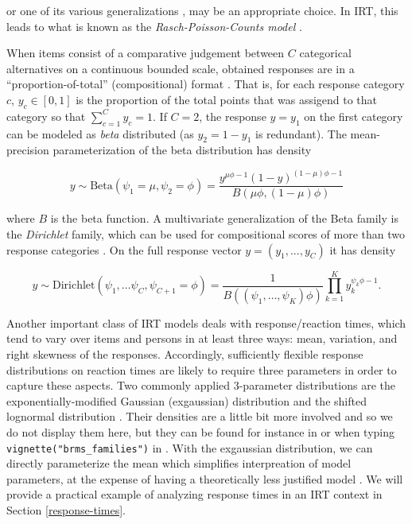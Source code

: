\documentclass[jss]{jss}
\begin{document}
or one of its various generalizations \citep[e.g., see][]{shmueli2005},
may be an appropriate choice. In IRT, this leads to what is known as the
\emph{Rasch-Poisson-Counts model} \citep[RPCM;][]{rasch1960}.

When items consist of a comparative judgement between \(C\) categorical
alternatives on a continuous bounded scale, obtained responses are in a
``proportion-of-total'' (compositional) format \citep{hijazi2009}. That
is, for each response category \(c\), \(y_c \in [0, 1]\) is the
proportion of the total points that was assigend to that category so
that \(\sum_{c=1}^C y_c = 1\). If \(C = 2\), the response \(y = y_1\) on
the first category can be modeled as \emph{beta} distributed (as
\(y_2 = 1 - y_1\) is redundant). The mean-precision parameterization of
the beta distribution has density

\[
y \sim \text{Beta}(\psi_1 = \mu, \psi_2 = \phi) = \frac{y^{\mu \phi - 1} (1-y)^{(1-\mu) \phi-1}}{B(\mu \phi, (1-\mu) \phi)}
\]

where \(B\) is the beta function. A multivariate generalization of the
Beta family is the \emph{Dirichlet} family, which can be used for
compositional scores of more than two response categories
\citep{hijazi2009}. On the full response vector \(y = (y_1, ..., y_C)\)
it has density

\[
y \sim \text{Dirichlet}(\psi_1, \ldots \psi_C, \psi_{C+1} = \phi) = 
 \frac{1}{B((\psi_{1}, \ldots, \psi_{K}) \phi)} 
 \prod_{k=1}^K y_{k}^{\psi_{k} \phi - 1}.
\]

Another important class of IRT models deals with response/reaction
times, which tend to vary over items and persons in at least three ways:
mean, variation, and right skewness of the responses. Accordingly,
sufficiently flexible response distributions on reaction times are
likely to require three parameters in order to capture these aspects.
Two commonly applied 3-parameter distributions are the
exponentially-modified Gaussian (exgaussian) distribution and the
shifted lognormal distribution \citep{heathcote1991, wagenmakers2007}.
Their densities are a little bit more involved and so we do not display
them here, but they can be found for instance in \citet{wagenmakers2007}
or when typing \texttt{vignette("brms\_families")} in . With
the exgaussian distribution, we can directly parameterize the mean which
simplifies interpreation of model parameters, at the expense of having a
theoretically less justified model \citep{heathcote1991}. We will
provide a practical example of analyzing response times in an IRT
context in Section \ref{response-times}.
\end{document}
